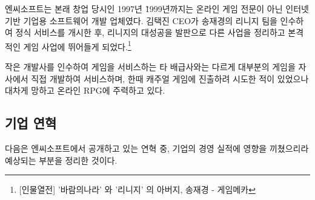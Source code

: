 \documentclass[11pt]{oblivoir}
\begin{document}
		엔씨소프트는 본래 창업 당시인 1997년 \~ 1999년까지는 온라인 게임 전문이 아닌 인터넷 기반 기업용 소프트웨어 개발 업체였다. 김택진 CEO가 송재경의 리니지 팀을 인수하여 정식 서비스를 개시한 후, 리니지의 대성공을 발판으로 다른 사업을 정리하고 본격적인 게임 사업에 뛰어들게 되었다.\footnote{[인물열전] '바람의나라' 와 '리니지' 의 아버지, 송재경 - 게임메카}
		
		작은 개발사를 인수하여 게임을 서비스하는 타 배급사와는 다르게 대부분의 게임을 자사에서 직접 개발하여 서비스하며, 한때 캐주얼 게임에 진출하려 시도한 적이 있었으나 대차게 망하고 온라인 RPG에 주력하고 있다.
		
		\subsection{기업 연혁}
			다음은 엔씨소프트에서 공개하고 있는 연혁 중, 기업의 경영 실적에 영향을 끼쳤으리라 예상되는 부분을 정리한 것이다.
\end{document}
